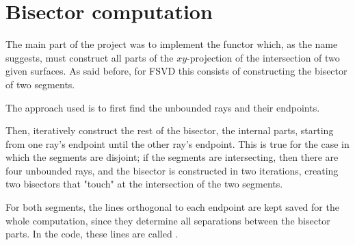 \documentclass[11pt,a4paper,english]{article}
\begin{document}
	

	\section{Bisector computation}
	The main part of the project was to implement the functor  which, as the name suggests, must construct all parts of the \(xy\)-projection of the intersection of two given surfaces. As said before, for FSVD this consists of constructing the bisector of two segments.\par
	The approach used is to first find the unbounded rays and their endpoints.\par
	Then, iteratively construct the rest of the bisector, the internal parts, starting from one ray's endpoint until the other ray's endpoint.
	This is true for the case in which the segments are disjoint; if the segments are intersecting, then there are four unbounded rays, and the bisector is constructed in two iterations, creating two bisectors that "touch" at the intersection of the two segments.\ppar
	
	For both segments, the lines orthogonal to each endpoint are kept saved for the whole computation, since they determine all separations between the bisector parts. In the code, these lines are called .
	
	
\end{document}
